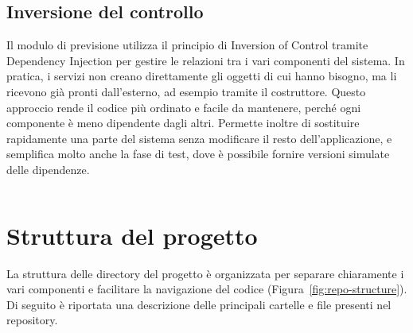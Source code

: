 \begin{listing}[H]
\inputminted[fontsize=\small, breaklines, linenos=true, bgcolor=gray!10]{python}{code/repository_pattern.py}
\caption{Esempio di repository per Chroma (\texttt{code/repository\_pattern.py}).}
\label{listing:repository-pattern}
\end{listing}

\subsection{Inversione del controllo}
Il modulo di previsione utilizza il principio di Inversion of Control tramite Dependency Injection per gestire le relazioni tra i vari componenti del sistema.
In pratica, i servizi non creano direttamente gli oggetti di cui hanno bisogno, ma li ricevono già pronti dall’esterno, ad esempio tramite il costruttore.
Questo approccio rende il codice più ordinato e facile da mantenere, perché ogni componente è meno dipendente dagli altri.
Permette inoltre di sostituire rapidamente una parte del sistema senza modificare il resto dell’applicazione, e semplifica molto anche la fase di test, dove è possibile fornire versioni simulate delle dipendenze.
\begin{listing}[H]
\inputminted[fontsize=\small, breaklines, linenos=true, bgcolor=gray!10]{python}{code/dependecy_injection.py}
\caption{Esempio di dependency injection (\texttt{forecasting\_service.py}).}
\label{listing:dependency-injection}
\end{listing}

\section{Struttura del progetto}
La struttura delle directory del progetto è organizzata per separare chiaramente i vari componenti e facilitare la navigazione del codice (Figura~\ref{fig:repo-structure}).
Di seguito è riportata una descrizione delle principali cartelle e file presenti nel repository.
